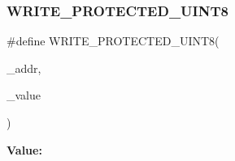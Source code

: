\subsubsection{\texorpdfstring{WRITE\_PROTECTED\_UINT8}{WRITE\_PROTECTED\_UINT8}}
{\footnotesize\ttfamily \#define W\+R\+I\+T\+E\+\_\+\+P\+R\+O\+T\+E\+C\+T\+E\+D\+\_\+\+U\+I\+N\+T8(\begin{DoxyParamCaption}\item[{}]{\+\_\+addr,  }\item[{}]{\+\_\+value }\end{DoxyParamCaption})}

{\bfseries Value\+:}
\begin{DoxyCode}{0}
\DoxyCodeLine{\textcolor{keywordflow}{do} \{ \(\backslash\)}
\DoxyCodeLine{        \}}

\end{DoxyCode}
